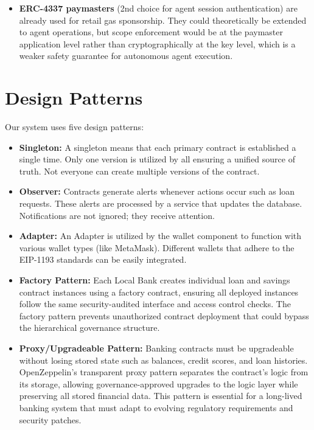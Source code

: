 \documentclass[12pt,a4paper]{report}
\begin{document}
\begin{itemize}[noitemsep]
\item \textbf{ERC-4337 paymasters} (2nd choice for agent session authentication) are already used for retail gas sponsorship. They could theoretically be extended to agent operations, but scope enforcement would be at the paymaster application level rather than cryptographically at the key level, which is a weaker safety guarantee for autonomous agent execution.
\end{itemize}


\section{Design Patterns}

Our system uses five design patterns:

\begin{itemize}[noitemsep]
\item \textbf{Singleton:} A singleton means that each primary contract is established a single time. Only one version is utilized by all ensuring a unified source of truth. Not everyone can create multiple versions of the contract.

\item \textbf{Observer:} Contracts generate alerts whenever actions occur such as loan requests. These alerts are processed by a service that updates the database. Notifications are not ignored; they receive attention.

\item \textbf{Adapter:} An Adapter is utilized by the wallet component to function with various wallet types (like MetaMask). Different wallets that adhere to the EIP-1193 standards can be easily integrated.

\item \textbf{Factory Pattern:} Each Local Bank creates individual loan and savings contract instances using a factory contract, ensuring all deployed instances follow the same security-audited interface and access control checks. The factory pattern prevents unauthorized contract deployment that could bypass the hierarchical governance structure.

\item \textbf{Proxy/Upgradeable Pattern:} Banking contracts must be upgradeable without losing stored state such as balances, credit scores, and loan histories. OpenZeppelin's transparent proxy pattern separates the contract's logic from its storage, allowing governance-approved upgrades to the logic layer while preserving all stored financial data. This pattern is essential for a long-lived banking system that must adapt to evolving regulatory requirements and security patches.
\end{itemize}
\end{document}

